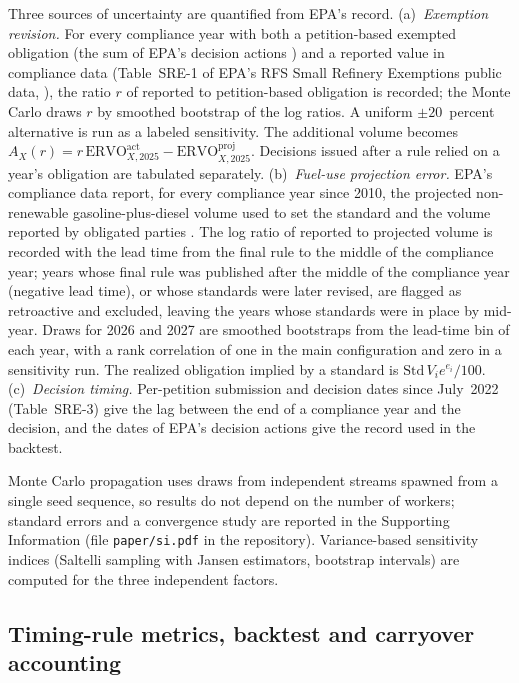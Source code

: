 \documentclass[preprint,12pt,authoryear]{elsarticle}
\begin{document}
Three sources of uncertainty are quantified from EPA's record. (a)~\emph{Exemption revision.} For every compliance year with both a petition-based exempted obligation (the sum of EPA's decision actions \citep{epa_420r25010,epa_420r25013,epa_420r26004,epa_420r26017}) and a reported value in compliance data (Table~SRE-1 of EPA's RFS Small Refinery Exemptions public data, \citealp{epa_sre_dashboard}), the ratio $r$ of reported to petition-based obligation is recorded; the Monte Carlo draws $r$ by smoothed bootstrap of the \valnRevisionPairs{} log ratios. A uniform $\pm 20$~percent alternative is run as a labeled sensitivity. The additional volume becomes $A_X(r) = r\,\mathrm{ERVO}^{\mathrm{act}}_{X,2025} - \mathrm{ERVO}^{\mathrm{proj}}_{X,2025}$. Decisions issued after a rule relied on a year's obligation are tabulated separately. (b)~\emph{Fuel-use projection error.} EPA's compliance data report, for every compliance year since 2010, the projected non-renewable gasoline-plus-diesel volume used to set the standard and the volume reported by obligated parties \citep{epa_rvo_dashboard}. The log ratio of reported to projected volume is recorded with the lead time from the final rule to the middle of the compliance year; years whose final rule was published after the middle of the compliance year (negative lead time), or whose standards were later revised, are flagged as retroactive and excluded, leaving the years whose standards were in place by mid-year. Draws for 2026 and 2027 are smoothed bootstraps from the lead-time bin of each year, with a rank correlation of one in the main configuration and zero in a sensitivity run. The realized obligation implied by a standard is $\mathrm{Std}\,V_i e^{e_i}/100$. (c)~\emph{Decision timing.} Per-petition submission and decision dates since July~2022 (Table~SRE-3) give the lag between the end of a compliance year and the decision, and the dates of EPA's decision actions give the record used in the backtest.

Monte Carlo propagation uses \valmcDraws{} draws from independent streams spawned from a single seed sequence, so results do not depend on the number of workers; standard errors and a convergence study are reported in the Supporting Information (file \texttt{paper/si.pdf} in the repository). Variance-based sensitivity indices (Saltelli sampling with Jansen estimators, bootstrap intervals) are computed for the three independent factors.

\subsection{Timing-rule metrics, backtest and carryover accounting}
\end{document}
